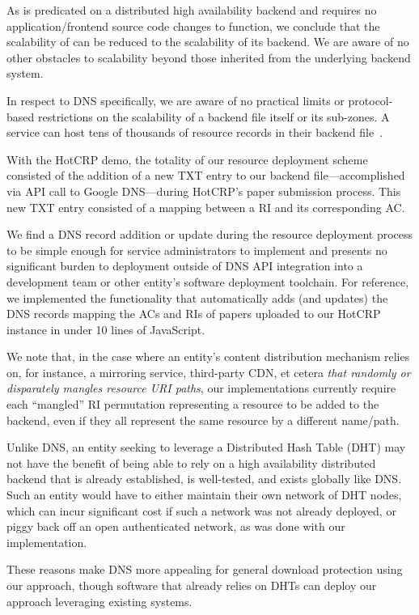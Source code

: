 As \SYSTEM{} is predicated on a distributed high availability backend and
requires no application/frontend source code changes to function, we conclude
that the scalability of \SYSTEM{} can be reduced to the scalability of its
backend. We are aware of no other obstacles to scalability beyond those
inherited from the underlying backend system.

In respect to DNS specifically, we are aware of no practical limits or
protocol-based restrictions on the scalability of a backend file itself or its
sub-zones. A service can host tens of thousands of resource records in their
backend file~\cite{DNS1, DNS2}.

With the HotCRP demo, the totality of our resource deployment scheme consisted
of the addition of a new TXT entry to our backend file---accomplished via API
call to Google DNS---during HotCRP's paper submission process. This new TXT
entry consisted of a mapping between a RI and its corresponding AC.

We find a DNS record addition or update during the resource deployment process
to be simple enough for service administrators to implement and presents no
significant burden to deployment outside of DNS API integration into a
development team or other entity's software deployment toolchain. For reference,
we implemented the functionality that automatically adds (and updates) the DNS
records mapping the ACs and RIs of papers uploaded to our HotCRP instance in
under 10 lines of JavaScript.

We note that, in the case where an entity's content distribution mechanism
relies on, for instance, a mirroring service, third-party CDN, et cetera
\emph{that randomly or disparately mangles resource URI paths}, our
implementations currently require each ``mangled'' RI permutation representing a
resource to be added to the backend, even if they all represent the same
resource by a different name/path.

Unlike DNS, an entity seeking to leverage a Distributed Hash Table (DHT) may not
have the benefit of being able to rely on a high availability distributed
backend that is already established, is well-tested, and exists
globally like DNS. Such an entity would have to either maintain their own
network of DHT nodes, which can incur significant cost if such a network was not
already deployed, or piggy back off an open authenticated network, as was done
with our implementation.

These reasons make DNS more appealing for general download protection using our
approach, though software that already relies on DHTs can deploy our approach
leveraging existing systems.

